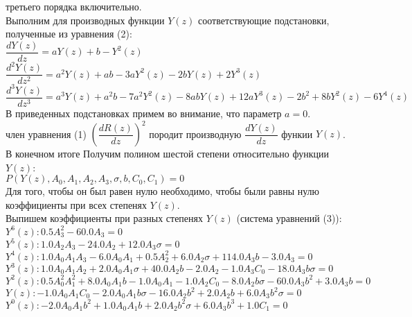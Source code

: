 \documentclass[12pt,a4paper,draft]{letter}
\begin{document}
третьего порядка включительно.\\
Выполним для производных функции $Y(z)$ соответствующие подстановки, полученные из уравнения (2):\\
$\dfrac{dY(z)}{dz} = a Y(z) + b - Y^2(z)$\\
$\dfrac{d^2 Y(z)}{dz^2} = a^2 Y(z) + a b - 3 a Y^2(z) - 2 b Y(z) + 2 Y^3(z)$\\
$\dfrac{d^3 Y(z)}{dz^3} = a^3 Y(z) + a^2 b - 7 a^2 Y^2(z) - 8 a b Y(z) + 12 a Y^3(z) - 2 b^2 + 8 b Y^2(z) - 6 Y^4(z)$\\
В приведенных подстановках примем во внимание, что параметр $a = 0$.\\
член уравнения (1) $\left(\dfrac{dR(z)}{dz}\right)^2$ породит производную $ \dfrac{dY(z)}{dz}$ функии $Y(z)$.
В конечном итоге Получим полином шестой степени относительно функции $Y(z)$:
\\
$P(Y(z), A_0, A_1, A_2, A_3, \sigma, b, C_0, C_1) = 0$
\\
Для того, чтобы он был равен нулю необходимо, чтобы были равны нулю коэффициенты при всех степенях $Y(z)$.
\\
Выпишем коэффициенты при разных степенях $Y(z)$ (система уравнений (3)):
\\
$Y^6(z): 0.5 A_3^2 - 60.0 A_3 = 0$\\
$Y^5(z): 1.0 A_2 A_3 - 24.0 A_2 + 12.0 A_3 \sigma = 0$\\
$Y^4(z): 1.0 A_0 A_1 A_3 - 6.0 A_0 A_1 + 0.5 A_2^2 + 6.0 A_2 \sigma + 114.0 A_3 b - 3.0 A_3 = 0$\\
$Y^3(z):  1.0 A_0 A_1 A_2 + 2.0 A_0 A_1 \sigma + 40.0 A_2 b - 2.0 A_2 - 1.0 A_3 C_0 - 18.0 A_3 b \sigma = 0$\\
$Y^2(z): 0.5 A_0^2 A_1^2 + 8.0 A_0 A_1 b - 1.0 A_0 A_1 - 1.0 A_2 C_0 - 8.0 A_2 b \sigma - 60.0 A_3 b^2 + 3.0 A_3 b = 0$\\
$Y(z): -1.0 A_0 A_1 C_0 - 2.0 A_0 A_1 b \sigma - 16.0 A_2 b^2 + 2.0 A_2 b + 6.0 A_3 b^2 \sigma = 0$\\
$Y^0(z): -2.0 A_0 A_1 b^2 + 1.0 A_0 A_1 b + 2.0 A_2 b^2 \sigma + 6.0 A_3 b^3 + 1.0 C_1 = 0$\\
\end{document}
